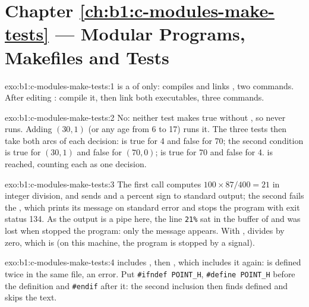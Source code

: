 \section*{Chapter \ref{ch:b1:c-modules-make-tests} --- Modular Programs, Makefiles and Tests}

\begin{solution}{exo:b1:c-modules-make-tests:1}
 is a  of  only:  compiles  and links
, two commands. After editing : compile it, then link both executables, three commands.
\end{solution}

\begin{solution}{exo:b1:c-modules-make-tests:2}
No: neither test makes  true without , so  never runs. Adding
$(30, 1)$ (or any age from 6 to 17) runs it. The three tests then take both arcs of each decision:  is
true for 4 and false for 70; the second condition is true for $(30, 1)$ and false for $(70, 0)$;  is
true for 70 and false for 4.  is reached, counting each  as one decision.
\end{solution}

\begin{solution}{exo:b1:c-modules-make-tests:3}
The first call computes $100 \times 87 / 400 = 21$ in integer division, and  sends  and a
percent sign to standard output; the second fails the , which prints its message on standard error and stops
the program with exit status 134. As the output is a pipe here, the line \texttt{21\%} sat in the buffer of
 and was lost when  stopped the program: only the message appears. With ,
 divides by zero, which is  (on this machine, the program is stopped by a
signal).
\end{solution}

\begin{solution}{exo:b1:c-modules-make-tests:4}
 includes , then , which includes it again:  is
defined twice in the same file, an error. Put \texttt{\#ifndef POINT\_H}, \texttt{\#define POINT\_H} before the definition
and \texttt{\#endif} after it: the second inclusion then finds  defined and skips the text.
\end{solution}

